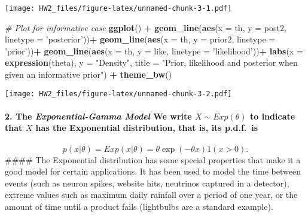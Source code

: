 \documentclass[]{article}
\newenvironment{Shaded}{\begin{snugshade}}{\end{snugshade}}
\newcommand{\KeywordTok}[1]{\textcolor[rgb]{0.13,0.29,0.53}{\textbf{#1}}}
\newcommand{\DataTypeTok}[1]{\textcolor[rgb]{0.13,0.29,0.53}{#1}}
\newcommand{\StringTok}[1]{\textcolor[rgb]{0.31,0.60,0.02}{#1}}
\newcommand{\CommentTok}[1]{\textcolor[rgb]{0.56,0.35,0.01}{\textit{#1}}}
\newcommand{\OperatorTok}[1]{\textcolor[rgb]{0.81,0.36,0.00}{\textbf{#1}}}
\newcommand{\NormalTok}[1]{#1}
\let\oldparagraph\paragraph
\renewcommand{\paragraph}[1]{\oldparagraph{#1}\mbox{}}
\begin{document}
\texttt{[image: HW2\_files/figure-latex/unnamed-chunk-3-1.pdf]}

\begin{Shaded}
\begin{Highlighting}[]
\CommentTok{# Plot for informative case}
\KeywordTok{ggplot}\NormalTok{() }\OperatorTok{+}\StringTok{ }
\StringTok{  }\KeywordTok{geom_line}\NormalTok{(}\KeywordTok{aes}\NormalTok{(}\DataTypeTok{x =}\NormalTok{ th, }\DataTypeTok{y =}\NormalTok{ post2, }\DataTypeTok{linetype =} \StringTok{'posterior'}\NormalTok{))}\OperatorTok{+}
\StringTok{  }\KeywordTok{geom_line}\NormalTok{(}\KeywordTok{aes}\NormalTok{(}\DataTypeTok{x =}\NormalTok{ th, }\DataTypeTok{y =}\NormalTok{ prior2, }\DataTypeTok{linetype =} \StringTok{'prior'}\NormalTok{))}\OperatorTok{+}
\StringTok{  }\KeywordTok{geom_line}\NormalTok{(}\KeywordTok{aes}\NormalTok{(}\DataTypeTok{x =}\NormalTok{ th, }\DataTypeTok{y =}\NormalTok{ like, }\DataTypeTok{linetype =} \StringTok{'likelihood'}\NormalTok{))}\OperatorTok{+}
\StringTok{  }\KeywordTok{labs}\NormalTok{(}\DataTypeTok{x =} \KeywordTok{expression}\NormalTok{(theta), }\DataTypeTok{y =} \StringTok{"Density"}\NormalTok{, }\DataTypeTok{title =} \StringTok{"Prior, likelihood and posterior when given an informative prior"}\NormalTok{) }\OperatorTok{+}\StringTok{ }\KeywordTok{theme_bw}\NormalTok{()}
\end{Highlighting}
\end{Shaded}

\texttt{[image: HW2\_files/figure-latex/unnamed-chunk-3-2.pdf]}

\paragraph{\texorpdfstring{2. The \textbf{\emph{Exponential-Gamma
Model}} We write \(X\sim Exp(\theta)\) to indicate that \(X\) has the
Exponential distribution, that is, its
p.d.f.~is}{2. The Exponential-Gamma Model We write X\textbackslash{}sim Exp(\textbackslash{}theta) to indicate that X has the Exponential distribution, that is, its p.d.f.~is}}\label{the-exponential-gamma-model-we-write-xsim-exptheta-to-indicate-that-x-has-the-exponential-distribution-that-is-its-p.d.f.is}

\[ p(x|\theta) = Exp(x|\theta) = \theta\exp(-\theta x)1(x>0). \]
\#\#\#\# The Exponential distribution has some special properties that
make it a good model for certain applications. It has been used to model
the time between events (such as neuron spikes, website hits, neutrinos
captured in a detector), extreme values such as maximum daily rainfall
over a period of one year, or the amount of time until a product fails
(lightbulbs are a standard example).
\end{document}
